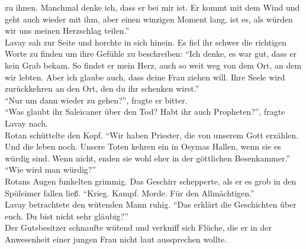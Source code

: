 zu ihnen. Manchmal denke ich, dass er bei mir ist. Er kommt mit dem Wind und geht auch wieder 
mit ihm, aber einen winzigen Moment lang, ist es, als würden wir uns meinen Herzschlag teilen.''\\
Lavay sah zur Seite und horchte in sich hinein. Es fiel ihr schwer die richtigen Worte zu finden um 
ihre Gefühle zu beschreiben: ``Ich denke, es war gut, dass er kein Grab bekam. So findet er mein 
Herz, auch so weit weg von dem Ort, an dem wir lebten. Aber ich glaube auch, dass deine Frau ziehen 
will. Ihre Seele wird zurückkehren an den Ort, den du ihr schenken wirst.''\\
``Nur um dann wieder zu gehen?'', fragte er bitter.\\
``Was glaubt ihr Saleicaner über den Tod? Habt ihr auch Propheten?'', fragte Lavay nach.\\
Rotan schüttelte den Kopf. ``Wir haben Priester, die von unserem Gott erzählen. Und die leben noch. 
Unsere Toten kehren ein in Osymas Hallen, wenn sie es würdig sind. Wenn nicht, enden sie wohl eher 
in der göttlichen Besenkammer.''\\
``Wie wird man würdig?''\\
Rotans Augen funkelten grimmig. Das Geschirr schepperte, als er es grob in den Spüleimer fallen 
ließ. ``Krieg. Kampf. Morde. Für den Allmächtigen.''\\
Lavay betrachtete den wütenden Mann ruhig. ``Das erklärt die Geschichten über euch. Du bist nicht 
sehr gläubig?''\\
Der Gutsbesitzer schnaufte wütend und verkniff sich Flüche, die er in der Anwesenheit einer jungen 
Frau nicht laut aussprechen wollte.\\

